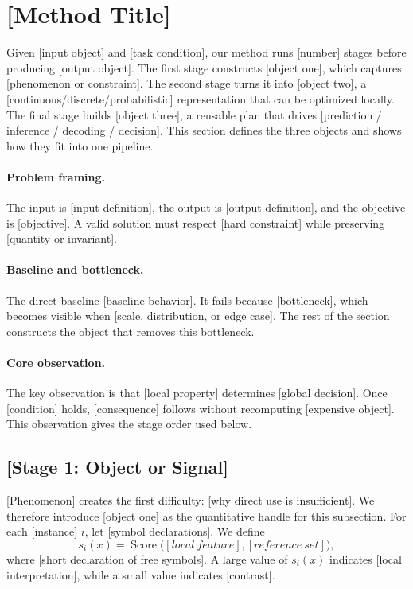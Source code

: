 
\section{[Method Title]}\label{sec:method}

Given [input object] and [task condition], our method runs [number] stages before producing [output object]. The first stage constructs [object one], which captures [phenomenon or constraint]. The second stage turns it into [object two], a [continuous/discrete/probabilistic] representation that can be optimized locally. The final stage builds [object three], a reusable plan that drives [prediction / inference / decoding / decision]. This section defines the three objects and shows how they fit into one pipeline.

\paragraph{Problem framing.}
The input is [input definition], the output is [output definition], and the objective is [objective]. A valid solution must respect [hard constraint] while preserving [quantity or invariant].

\paragraph{Baseline and bottleneck.}
The direct baseline [baseline behavior]. It fails because [bottleneck], which becomes visible when [scale, distribution, or edge case]. The rest of the section constructs the object that removes this bottleneck.

\paragraph{Core observation.}
The key observation is that [local property] determines [global decision]. Once [condition] holds, [consequence] follows without recomputing [expensive object]. This observation gives the stage order used below.

\subsection{[Stage 1: Object or Signal]}\label{sec:stage-one}

[Phenomenon] creates the first difficulty: [why direct use is insufficient]. We therefore introduce [object one] as the quantitative handle for this subsection. For each [instance] $i$, let [symbol declarations]. We define
\begin{equation}\label{eq:stage-one-score}
    s_i(x)=\operatorname{Score}\bigl([local\ feature], [reference\ set]\bigr),
\end{equation}
where [short declaration of free symbols]. A large value of $s_i(x)$ indicates [local interpretation], while a small value indicates [contrast].

